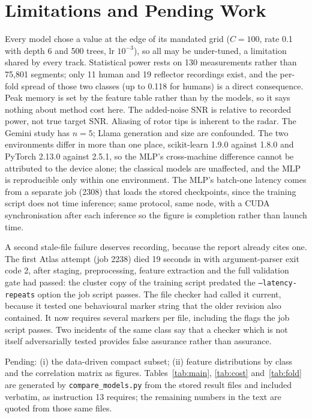 \documentclass[conference]{IEEEtran}
\begin{document}
\section{Limitations and Pending Work}
Every model chose a value at the edge of its mandated grid ($C=100$, rate 0.1 with depth 6 and 500 trees, lr $10^{-3}$), so all may be under-tuned, a limitation shared by every track. Statistical power rests on 130 measurements rather than 75,801 segments; only 11 human and 19 reflector recordings exist, and the per-fold spread of those two classes (up to 0.118 for humans) is a direct consequence. Peak memory is set by the feature table rather than by the models, so it says nothing about method cost here. The added-noise SNR is relative to recorded power, not true target SNR. Aliasing of rotor tips is inherent to the radar. The Gemini study has $n=5$; Llama generation and size are confounded. The two environments differ in more than one place, scikit-learn 1.9.0 against 1.8.0 and PyTorch 2.13.0 against 2.5.1, so the MLP's cross-machine difference cannot be attributed to the device alone; the classical models are unaffected, and the MLP is reproducible only within one environment. The MLP's batch-one latency comes from a separate job (2308) that loads the stored checkpoints, since the training script does not time inference; same protocol, same node, with a CUDA synchronisation after each inference so the figure is completion rather than launch time.

A second stale-file failure deserves recording, because the report already cites one. The first Atlas attempt (job 2238) died 19 seconds in with argument-parser exit code 2, after staging, preprocessing, feature extraction and the full validation gate had passed: the cluster copy of the training script predated the \texttt{--latency-repeats} option the job script passes. The file checker had called it current, because it tested one behavioural marker string that the older revision also contained. It now requires several markers per file, including the flags the job script passes. Two incidents of the same class say that a checker which is not itself adversarially tested provides false assurance rather than assurance.

Pending: (i) the data-driven compact subset; (ii) feature distributions by class and the correlation matrix as figures. Tables~\ref{tab:main}, \ref{tab:cost} and~\ref{tab:fold} are generated by \texttt{compare\_models.py} from the stored result files and included verbatim, as instruction 13 requires; the remaining numbers in the text are quoted from those same files.
\end{document}
